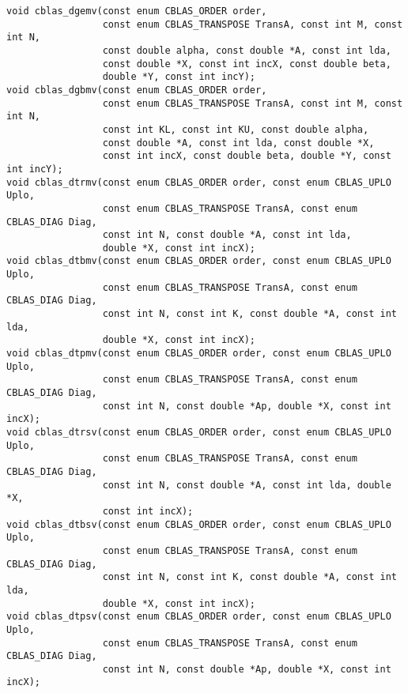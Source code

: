 \documentclass{article}
\begin{document}
\begin{Verbatim}[fontsize=\small,fontfamily=tt,fontshape=rm]
void cblas_dgemv(const enum CBLAS_ORDER order,
                 const enum CBLAS_TRANSPOSE TransA, const int M, const int N,
                 const double alpha, const double *A, const int lda,
                 const double *X, const int incX, const double beta,
                 double *Y, const int incY);
void cblas_dgbmv(const enum CBLAS_ORDER order,
                 const enum CBLAS_TRANSPOSE TransA, const int M, const int N,
                 const int KL, const int KU, const double alpha,
                 const double *A, const int lda, const double *X,
                 const int incX, const double beta, double *Y, const int incY);
void cblas_dtrmv(const enum CBLAS_ORDER order, const enum CBLAS_UPLO Uplo,
                 const enum CBLAS_TRANSPOSE TransA, const enum CBLAS_DIAG Diag,
                 const int N, const double *A, const int lda, 
                 double *X, const int incX);
void cblas_dtbmv(const enum CBLAS_ORDER order, const enum CBLAS_UPLO Uplo,
                 const enum CBLAS_TRANSPOSE TransA, const enum CBLAS_DIAG Diag,
                 const int N, const int K, const double *A, const int lda, 
                 double *X, const int incX);
void cblas_dtpmv(const enum CBLAS_ORDER order, const enum CBLAS_UPLO Uplo,
                 const enum CBLAS_TRANSPOSE TransA, const enum CBLAS_DIAG Diag,
                 const int N, const double *Ap, double *X, const int incX);
void cblas_dtrsv(const enum CBLAS_ORDER order, const enum CBLAS_UPLO Uplo,
                 const enum CBLAS_TRANSPOSE TransA, const enum CBLAS_DIAG Diag,
                 const int N, const double *A, const int lda, double *X,
                 const int incX);
void cblas_dtbsv(const enum CBLAS_ORDER order, const enum CBLAS_UPLO Uplo,
                 const enum CBLAS_TRANSPOSE TransA, const enum CBLAS_DIAG Diag,
                 const int N, const int K, const double *A, const int lda,
                 double *X, const int incX);
void cblas_dtpsv(const enum CBLAS_ORDER order, const enum CBLAS_UPLO Uplo,
                 const enum CBLAS_TRANSPOSE TransA, const enum CBLAS_DIAG Diag,
                 const int N, const double *Ap, double *X, const int incX);


\end{Verbatim}
\end{document}
